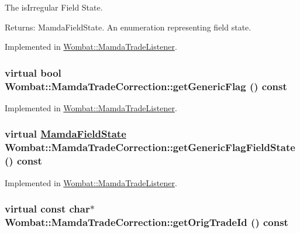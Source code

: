 The is\-Irregular Field State. 

\begin{Desc}
\item[Returns:]Mamda\-Field\-State. An enumeration representing field state. \end{Desc}


Implemented in \hyperlink{classWombat_1_1MamdaTradeListener_f8e874c8dc039fb83f1e9f4a8bdcbc6f}{Wombat::Mamda\-Trade\-Listener}.\hypertarget{classWombat_1_1MamdaTradeCorrection_910eefbcd0095d44cd615d3fec76701d}{
\subsubsection[getGenericFlag]{\setlength{\rightskip}{0pt plus 5cm}virtual bool Wombat::Mamda\-Trade\-Correction::get\-Generic\-Flag () const}}
\label{classWombat_1_1MamdaTradeCorrection_910eefbcd0095d44cd615d3fec76701d}




Implemented in \hyperlink{classWombat_1_1MamdaTradeListener_f6591781ca46aa1392877bbf12c9e2f5}{Wombat::Mamda\-Trade\-Listener}.\hypertarget{classWombat_1_1MamdaTradeCorrection_31dbf48a3740fb8c349dce93d311c1d9}{
\subsubsection[getGenericFlagFieldState]{\setlength{\rightskip}{0pt plus 5cm}virtual \hyperlink{namespaceWombat_93aac974f2ab713554fd12a1fa3b7d2a}{Mamda\-Field\-State} Wombat::Mamda\-Trade\-Correction::get\-Generic\-Flag\-Field\-State () const}}
\label{classWombat_1_1MamdaTradeCorrection_31dbf48a3740fb8c349dce93d311c1d9}




Implemented in \hyperlink{classWombat_1_1MamdaTradeListener_98bb7d4f99af6f7b565506fb9b79665d}{Wombat::Mamda\-Trade\-Listener}.\hypertarget{classWombat_1_1MamdaTradeCorrection_a68503dc9dfcd36a5a20889ce4a207af}{
\subsubsection[getOrigTradeId]{\setlength{\rightskip}{0pt plus 5cm}virtual const char$\ast$ Wombat::Mamda\-Trade\-Correction::get\-Orig\-Trade\-Id () const}}
\label{classWombat_1_1MamdaTradeCorrection_a68503dc9dfcd36a5a20889ce4a207af}


